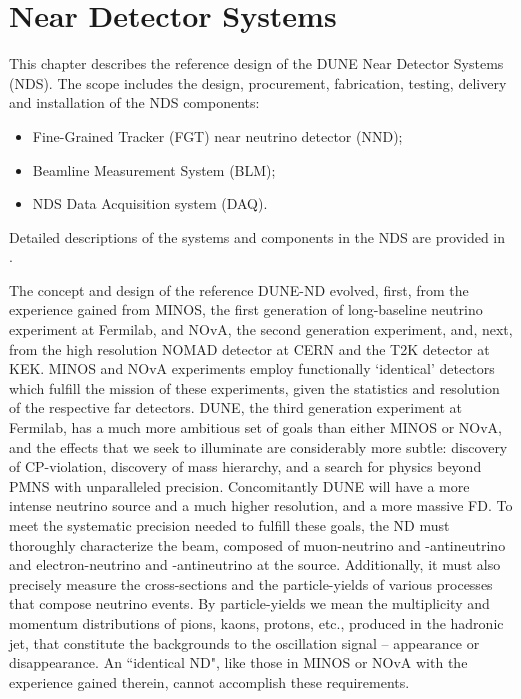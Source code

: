 \section{Near Detector Systems}
\label{sec:detectors-nd-ref-ov}

This chapter describes the reference design of the DUNE Near Detector Systems (NDS). The scope includes the design, procurement, fabrication, testing, delivery and installation of the NDS components: 

\begin{itemize}
\item Fine-Grained Tracker (FGT) near neutrino detector (NND);
\item Beamline Measurement System (BLM);  
\item NDS Data Acquisition system (DAQ).  
\end{itemize}
Detailed descriptions of the systems and components in the NDS are provided in \anxndref. 


The concept and design of the reference DUNE-ND evolved, first,  from the experience gained 
from MINOS, the first generation of long-baseline neutrino experiment at Fermilab, 
and NOvA, the second generation experiment, and, next, from the high resolution NOMAD detector at CERN 
and the T2K detector at KEK. MINOS and NOvA experiments employ functionally `identical' detectors which 
fulfill the mission of these experiments, given the statistics and resolution of the respective far detectors. 
DUNE, the third generation experiment at Fermilab, has a much more ambitious set of goals than 
either MINOS or NOvA,  and the effects that we seek to illuminate are
considerably more subtle: 
discovery of CP-violation, discovery of mass hierarchy, and a search for 
physics beyond PMNS with unparalleled precision. Concomitantly DUNE will have a more intense 
neutrino source and a much higher resolution, and a more massive FD.  
To meet the systematic precision needed to fulfill these goals,
the ND must thoroughly characterize the beam, composed of muon-neutrino and -antineutrino 
and electron-neutrino and -antineutrino at the source. Additionally, it must also precisely measure 
the cross-sections and the particle-yields of various processes that compose  neutrino events. 
By particle-yields we mean the multiplicity and momentum distributions of pions, kaons, protons, etc., 
produced in the hadronic jet, that constitute the backgrounds to the oscillation signal -- appearance or 
disappearance. An ``identical ND", like those in MINOS or NOvA with the experience gained therein, 
cannot accomplish these requirements. 

